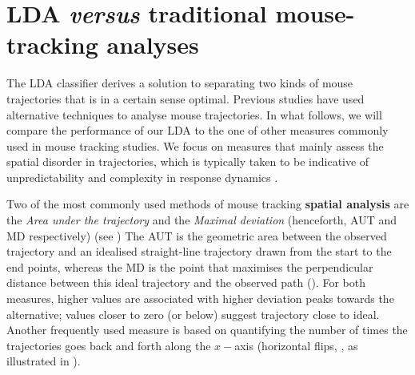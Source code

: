 \documentclass{article}
\begin{document}
\section{LDA \emph{versus} traditional mouse-tracking analyses}
\label{section:other-mt}
The LDA classifier derives a solution to separating two kinds of mouse trajectories that is in a certain sense optimal. Previous studies have used alternative techniques to analyse mouse trajectories. In what follows, we will compare the performance of our LDA to the one of other measures commonly used in mouse tracking studies. We focus on measures that mainly assess the spatial disorder in trajectories, which is typically taken to be indicative of unpredictability and complexity in response dynamics \citep{Hehman2014}.

Two of the most commonly used methods of mouse tracking \textbf{spatial analysis} are the \textit{Area under the trajectory} and the \textit{Maximal deviation} (henceforth, AUT and MD respectively) (see \citealp{Freeman2010})
The AUT is the geometric area between the observed trajectory and an idealised straight-line trajectory drawn from the start to the end points, whereas the MD is the point that maximises the perpendicular distance between this ideal trajectory and the observed path
(). For both measures, higher values are associated with higher deviation peaks towards the alternative; values closer to zero (or below) suggest trajectory close to ideal. 
Another frequently used measure is based on quantifying the number of times the trajectories goes back and forth along the $x-$axis (horizontal flips, \citealp{Dale2011}, as illustrated in ).
\end{document}

